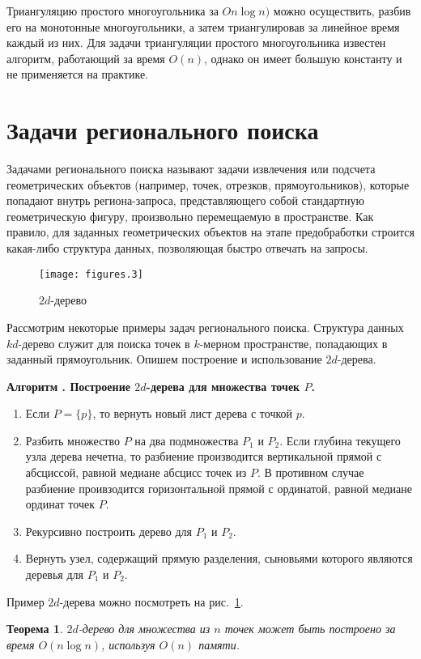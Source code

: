 \documentclass[a4paper]{article}
\newcounter{algorithm}
\newenvironment{algorithm}[1]{\par\smallskip\noindent\refstepcounter{algorithm}%
  \textbf{Алгоритм \arabic{algorithm}. #1}\begin{enumerate}}{\end{enumerate}}
\newtheorem{theorem}{Теорема}
\begin{document}
Триангуляцию простого многоугольника за $On \log n)$ можно
осуществить, разбив его на монотонные многоугольники, а затем
триангулировав за линейное время каждый из них.
Для задачи триангуляции простого многоугольника известен алгоритм,
работающий за время $O(n)$, однако он имеет большую константу и не
применяется на практике.

\section{Задачи регионального поиска}
Задачами регионального поиска называют задачи извлечения или подсчета
геометрических объектов (например, точек, отрезков, прямоугольников),
которые попадают внутрь региона-запроса, представляющего собой стандартную
геометрическую фигуру, произвольно перемещаемую в пространстве.
Как правило, для заданных геометрических объектов на этапе
предобработки строится какая-либо структура данных, позволяющая быстро
отвечать на запросы.

\begin{figure}[t]
  \centering
  \texttt{[image: figures.3]}
  \caption{$2d$-дерево}
  \label{fig:2d-tree}
\end{figure}


Рассмотрим некоторые примеры задач регионального поиска. Структура
данных $kd$-дерево служит для поиска точек в $k$-мерном пространстве,
попадающих в заданный прямоугольник. Опишем построение и использование
$2d$-дерева.

\begin{algorithm}{Построение $2d$-дерева для множества точек $P$.}
\item Если $P = \{p\}$, то вернуть новый лист дерева с точкой $p$.
\item Разбить множество $P$ на два подмножества $P_1$ и $P_2$.
  Если глубина текущего узла дерева нечетна, то разбиение производится
  вертикальной прямой с абсциссой, равной медиане абсцисс точек из $P$.
  В противном случае разбиение проивзодится горизонтальной прямой с
  ординатой, равной медиане ординат точек $P$.
\item Рекурсивно построить дерево для $P_1$ и $P_2$.
\item Вернуть узел, содержащий прямую разделения, сыновьями которого
  являются деревья для $P_1$ и $P_2$.
\end{algorithm}
Пример $2d$-дерева можно посмотреть на рис.~\ref{fig:2d-tree}.

\begin{theorem}
  $2d$-дерево для множества из $n$ точек может быть построено за время
  $O(n \log n)$, используя $O(n)$ памяти.
\end{theorem}
\end{document}
